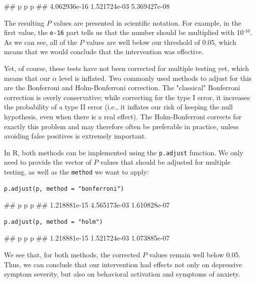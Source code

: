 \begin{example}
##            p            p            p 
## 4.062936e-16 1.521724e-03 5.369427e-08 
\end{example}

The resulting $P$ values are presented in scientific notation. For example, in the first value, the \texttt{e-16} part tells us that the number should be multiplied with 10$^{\text{-16}}$. As we can see, all of the $P$ values are well below our threshold of 0.05, which means that we would conclude that the intervention was effective.

Yet, of course, these tests have not been corrected for multiple testing yet, which means that our $\alpha$ level is inflated. Two commonly used methods to adjust for this are the Bonferroni and Holm-Bonferroni \citep{holm1979simple} correction. The "classical" Bonferroni correction is overly conservative; while correcting for the type I error, it increases the probability of a type II error (i.e., it inflates our risk of keeping the null hypothesis, even when there is a real effect). The Holm-Bonferroni corrects for exactly this problem and may therefore often be preferable in practice, unless avoiding false positives is extremely important. 

In \textsf{R}, both methods can be implemented using the \texttt{p.adjust} function. We only need to provide the vector of $P$ values that should be adjusted for multiple testing, as well as the \texttt{method} we want to apply:

\begin{lstlisting}
p.adjust(p, method = "bonferroni")
\end{lstlisting}

\begin{example}
##            p            p            p 
## 1.218881e-15 4.565173e-03 1.610828e-07 
\end{example}

\begin{lstlisting}
p.adjust(p, method = "holm")
\end{lstlisting}

\begin{example}
##            p            p            p 
## 1.218881e-15 1.521724e-03 1.073885e-07 
\end{example}

We see that, for both methods, the corrected $P$ values remain well below 0.05. Thus, we can conclude that our intervention had effects not only on depressive symptom severity, but also on behavioral activation and symptoms of anxiety.


